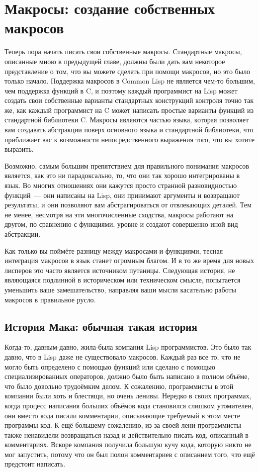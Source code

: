 \chapter{Макросы: создание собственных макросов}
\label{ch:08}

Теперь пора начать писать свои собственные макросы. Стандартные макросы, описанные мною в
предыдущей главе, должны были дать вам некоторое представление о том, что вы можете
сделать при помощи макросов, но это было только начало. Поддержка макросов в Common Lisp
не является чем-то большим, чем поддержка функций в C, и поэтому каждый программист на
Lisp может создать свои собственные варианты стандартных конструкций контроля точно так
же, как каждый программист на C может написать простые варианты функций из стандартной
библиотеки C. Макросы являются частью языка, которая позволяет вам создавать абстракции
поверх основного языка и стандартной библиотеки, что приближает вас к возможности
непосредственного выражения того, что вы хотите выразить.

Возможно, самым большим препятствием для правильного понимания макросов является, как это
ни парадоксально, то, что они так хорошо интегрированы в язык. Во многих отношениях они
кажутся просто странной разновидностью функций~--- они написаны на Lisp, они принимают
аргументы и возвращают результаты, и они позволяют вам абстрагироваться от отвлекающих
деталей. Тем не менее, несмотря на эти многочисленные сходства, макросы работают на
другом, по сравнению с функциями, уровне и создают совершенно иной вид абстракции.

Как только вы поймёте разницу между макросами и функциями, тесная интеграция макросов в
язык станет огромным благом. И в то же время для новых лисперов это часто является
источником путаницы. Следующая история, не являющаяся подлинной в историческом или
техническом смысле, попытается уменьшить ваше замешательство, направляя ваши мысли
касательно работы макросов в правильное русло.

\section{История Мака: обычная такая история}

Когда-то, давным-давно, жила-была компания Lisp программистов. Это было так давно, что в
Lisp даже не существовало макросов. Каждый раз все то, что не могло быть определено с
помощью функций или сделано с помощью специализированных операторов, должно было быть
написано в полном объёме, что было довольно трудоёмким делом. К сожалению, программисты в
этой компании были хоть и блестящи, но очень ленивы. Нередко в своих программах, когда
процесс написания больших объёмов кода становился слишком утомителен, они вместо кода
писали комментарии, описывающие требуемый в этом месте программы код. К ещё большему
сожалению, из-за своей лени программисты также ненавидели возвращаться назад и
действительно писать код, описанный в комментариях. Вскоре компания получила большую кучу
кода, которую никто не мог запустить, потому что он был полон комментариев с описанием
того, что ещё предстоит написать.

